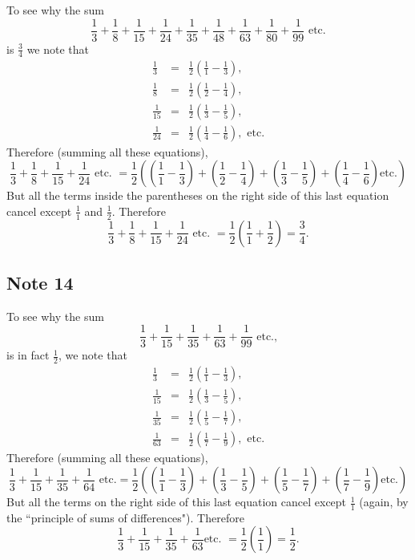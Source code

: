 \documentclass[twoside,openright]{article}
\begin{document}
To see why the sum 
$$\frac{1}{3} +
\frac{1}{8} + \frac{1}{15} + \frac{1}{24} + \frac{1}{35} + \frac{1}{48} +
\frac{1}{63} + \frac{1}{80} + \frac{1}{99}\mbox{ etc.}$$ is $\frac{3}{4}$
we note that
\begin{eqnarray*}
  \frac{1}{3} &  = & \frac{1}{2}\left(\frac{1}{1} - \frac{1}{3}\right),\\
  \frac{1}{8} & = & \frac{1}{2}\left(\frac{1}{2} - \frac{1}{4}\right),\\
  \frac{1}{15} & = & \frac{1}{2}\left(\frac{1}{3} - \frac{1}{5}\right),\\
  \frac{1}{24} & = & \frac{1}{2}\left(\frac{1}{4} - \frac{1}{6}\right), \mbox{ etc.}
\end{eqnarray*}
Therefore (summing all these equations),
$$\frac{1}{3} + \frac{1}{8} + \frac{1}{15} + \frac{1}{24} \mbox{ etc. } = 
\frac{1}{2}\left(\left(\frac{1}{1} - \frac{1}{3}\right) +
  \left(\frac{1}{2} - \frac{1}{4}\right) + \left(\frac{1}{3} -
    \frac{1}{5}\right) + \left(\frac{1}{4} - \frac{1}{6}\right)
  \mbox{etc.}\right)$$
But all the terms inside the parentheses on the
right side of this last equation cancel except $\frac{1}{1}$ and
$\frac{1}{2}$.  Therefore
$$ \frac{1}{3} + \frac{1}{8} + \frac{1}{15} + \frac{1}{24} \mbox{ etc. } = \frac{1}{2}\left(\frac{1}{1}  + \frac{1}{2}\right) = \frac{3}{4}.$$

\subsection*{Note 14}
\label{ctp14}

To see why the sum
$$\frac{1}{3} + \frac{1}{15} +
\frac{1}{35} + \frac{1}{63} + \frac{1}{99}\mbox{ etc.,}$$ is in fact $\frac{1}{2}$, we note that 
\begin{eqnarray*}
  \frac{1}{3} &  = & \frac{1}{2}\left(\frac{1}{1} - \frac{1}{3}\right),\\
  \frac{1}{15} & = & \frac{1}{2}\left(\frac{1}{3} - \frac{1}{5}\right),\\
  \frac{1}{35} & = & \frac{1}{2}\left(\frac{1}{5} - \frac{1}{7}\right),\\
  \frac{1}{63} & = & \frac{1}{2}\left(\frac{1}{7} - \frac{1}{9}\right), \mbox{ etc.}
\end{eqnarray*}
Therefore (summing all these equations),
$$\frac{1}{3} + \frac{1}{15} + \frac{1}{35} + \frac{1}{64} \mbox{ etc.} = 
\frac{1}{2}\left(\left(\frac{1}{1} - \frac{1}{3}\right) +
  \left(\frac{1}{3} - \frac{1}{5}\right) + \left(\frac{1}{5} -
    \frac{1}{7}\right) + \left(\frac{1}{7} - \frac{1}{9}\right)
  \mbox{etc.}\right)$$
But all the terms on the right side of this last equation cancel
except $\frac{1}{1}$ (again, by the ``principle of sums of
differences").  Therefore
$$ \frac{1}{3} + \frac{1}{15} + \frac{1}{35} + \frac{1}{63} \mbox{
  etc. } = \frac{1}{2}\left(\frac{1}{1}\right) = \frac{1}{2}.$$
\end{document}
